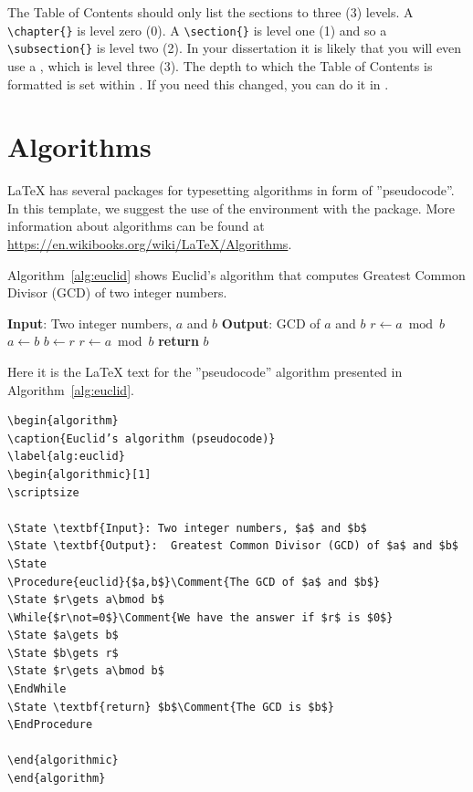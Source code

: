 The Table of Contents should only list the sections to three (3) levels. A \texttt{\textbackslash chapter\{\}} is level zero (0). A \texttt{\textbackslash section\{\}} is level one (1) and so a \texttt{\textbackslash subsection\{\}} is level two (2). In your dissertation it is likely that you will even use a , which is level three (3). The depth to which the Table of Contents is formatted is set within . If you need this changed, you can do it in .


\section{Algorithms}

 \LaTeX{}  has several packages for typesetting algorithms in form of ''pseudocode''. In this template, we suggest the use of the  environment with the  package. 
More information about algorithms can be found at \url{https://en.wikibooks.org/wiki/LaTeX/Algorithms}.

Algorithm~\ref{alg:euclid} shows Euclid's algorithm that computes  Greatest Common Divisor (GCD) of two integer numbers.

\begin{algorithm}[b]
\caption{Euclid’s algorithm}
\label{alg:euclid}
\begin{algorithmic}[1]
\scriptsize

\State \textbf{Input}: Two integer numbers, $a$ and $b$
\State \textbf{Output}: GCD of $a$ and $b$
\State
{}
\State $r\gets a\bmod b$
\State $a\gets b$
\State $b\gets r$
\State $r\gets a\bmod b$
\EndWhile
\State \textbf{return} $b$
\EndProcedure

\end{algorithmic}
\end{algorithm}

Here it is the \LaTeX{} text for the ''pseudocode'' algorithm presented in  Algorithm~\ref{alg:euclid}.

\begin{verbatim}
\begin{algorithm}
\caption{Euclid’s algorithm (pseudocode)}
\label{alg:euclid}
\begin{algorithmic}[1]
\scriptsize

\State \textbf{Input}: Two integer numbers, $a$ and $b$
\State \textbf{Output}:  Greatest Common Divisor (GCD) of $a$ and $b$
\State
\Procedure{euclid}{$a,b$}\Comment{The GCD of $a$ and $b$}
\State $r\gets a\bmod b$
\While{$r\not=0$}\Comment{We have the answer if $r$ is $0$}
\State $a\gets b$
\State $b\gets r$
\State $r\gets a\bmod b$
\EndWhile
\State \textbf{return} $b$\Comment{The GCD is $b$}
\EndProcedure

\end{algorithmic}
\end{algorithm}
\end{verbatim}

